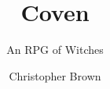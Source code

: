 \documentclass[a4paper,10pt,twocolumn]{memoir}
\title{Coven}
\subtitle{An RPG of Witches}
\author{Christopher Brown}
\begin{document}
\frontmatter

\titlepage



\tableofcontents*

\mainmatter



\backmatter

\printindex
\end{document}
